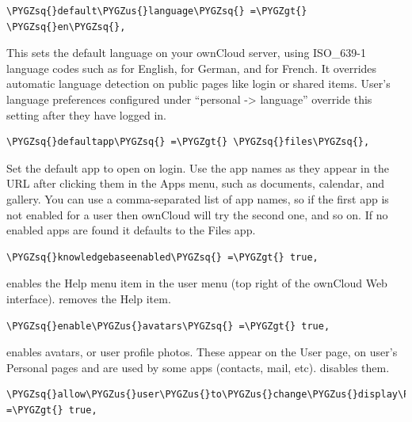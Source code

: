 \documentclass[letterpaper,10pt,english]{sphinxmanual}
\def\PYGZus{\char`\_}
\def\PYGZgt{\char`\>}
\def\PYGZsq{\char`\'}
\begin{document}
\begin{Verbatim}[commandchars=\\\{\}]
\PYGZsq{}default\PYGZus{}language\PYGZsq{} =\PYGZgt{} \PYGZsq{}en\PYGZsq{},
\end{Verbatim}

This sets the default language on your ownCloud server, using ISO\_639-1
language codes such as  for English,  for German, and  for
French. It overrides automatic language detection on public pages like login
or shared items. User's language preferences configured under ``personal -\textgreater{}
language'' override this setting after they have logged in.

\begin{Verbatim}[commandchars=\\\{\}]
\PYGZsq{}defaultapp\PYGZsq{} =\PYGZgt{} \PYGZsq{}files\PYGZsq{},
\end{Verbatim}

Set the default app to open on login. Use the app names as they appear in the
URL after clicking them in the Apps menu, such as documents, calendar, and
gallery. You can use a comma-separated list of app names, so if the first
app is not enabled for a user then ownCloud will try the second one, and so
on. If no enabled apps are found it defaults to the Files app.

\begin{Verbatim}[commandchars=\\\{\}]
\PYGZsq{}knowledgebaseenabled\PYGZsq{} =\PYGZgt{} true,
\end{Verbatim}

 enables the Help menu item in the user menu (top right of the
ownCloud Web interface).  removes the Help item.

\begin{Verbatim}[commandchars=\\\{\}]
\PYGZsq{}enable\PYGZus{}avatars\PYGZsq{} =\PYGZgt{} true,
\end{Verbatim}

 enables avatars, or user profile photos. These appear on the User
page, on user's Personal pages and are used by some apps (contacts, mail,
etc).  disables them.

\begin{Verbatim}[commandchars=\\\{\}]
\PYGZsq{}allow\PYGZus{}user\PYGZus{}to\PYGZus{}change\PYGZus{}display\PYGZus{}name\PYGZsq{} =\PYGZgt{} true,
\end{Verbatim}
\end{document}
